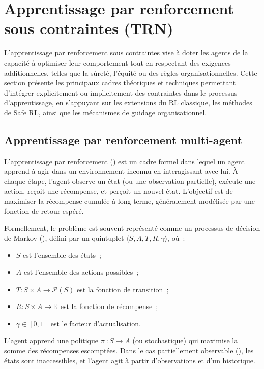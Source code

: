 \section{Apprentissage par renforcement sous contraintes (TRN)}

L'apprentissage par renforcement sous contraintes vise à doter les agents de la capacité à optimiser leur comportement tout en respectant des exigences additionnelles, telles que la sûreté, l'équité ou des règles organisationnelles. Cette section présente les principaux cadres théoriques et techniques permettant d'intégrer explicitement ou implicitement des contraintes dans le processus d'apprentissage, en s'appuyant sur les extensions du RL classique, les méthodes de Safe RL, ainsi que les mécanismes de guidage organisationnel.

\subsection{Apprentissage par renforcement multi-agent}

L'apprentissage par renforcement () est un cadre formel dans lequel un agent apprend à agir dans un environnement inconnu en interagissant avec lui. À chaque étape, l'agent observe un état (ou une observation partielle), exécute une action, reçoit une récompense, et perçoit un nouvel état. L'objectif est de maximiser la récompense cumulée à long terme, généralement modélisée par une fonction de retour espéré.

Formellement, le problème est souvent représenté comme un processus de décision de Markov (), défini par un quintuplet $\langle S, A, T, R, \gamma \rangle$, où~:
\begin{itemize}
  \item $S$ est l'ensemble des états~;
  \item $A$ est l'ensemble des actions possibles~;
  \item $T: S \times A \rightarrow \mathcal{P}(S)$ est la fonction de transition~;
  \item $R: S \times A \rightarrow \mathbb{R}$ est la fonction de récompense~;
  \item $\gamma \in [0,1]$ est le facteur d'actualisation.
\end{itemize}

L'agent apprend une politique $\pi~: S \rightarrow A$ (ou stochastique) qui maximise la somme des récompenses escomptées. Dans le cas partiellement observable (), les états sont inaccessibles, et l'agent agit à partir d'observations et d'un historique.



